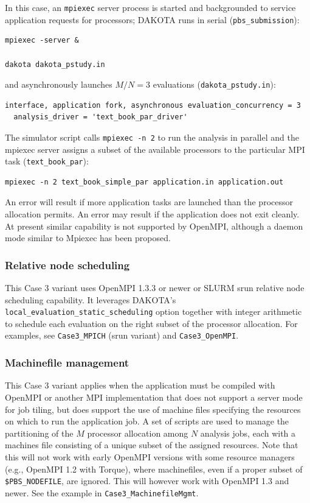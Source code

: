 In this case, an {\tt mpiexec} server process is started and
backgrounded to service application requests for processors; DAKOTA
runs in serial ({\tt pbs\_submission}):
\begin{verbatim}
mpiexec -server &

dakota dakota_pstudy.in
\end{verbatim}
and asynchronously launches $M/N=3$ evaluations ({\tt dakota\_pstudy.in}):
\begin{verbatim}
interface, application fork, asynchronous evaluation_concurrency = 3
  analysis_driver = 'text_book_par_driver'
\end{verbatim}
The simulator script calls {\tt mpiexec -n 2} to run the analysis in
parallel and the mpiexec server assigns a subset of the available
processors to the particular MPI task ({\tt text\_book\_par}):
\begin{verbatim}
mpiexec -n 2 text_book_simple_par application.in application.out
\end{verbatim}
An error will result if more application tasks are launched than the
processor allocation permits.  An error may result if the application
does not exit cleanly.  At present similar capability is not supported
by OpenMPI, although a daemon mode similar to Mpiexec has been
proposed.

\subsubsection{Relative node scheduling}

This Case 3 variant uses OpenMPI 1.3.3 or newer or SLURM srun relative
node scheduling capability.  It leverages DAKOTA's
\texttt{local\_evaluation\_static\_scheduling} option together with
integer arithmetic to schedule each evaluation on the right subset of
the processor allocation.  For examples, see \texttt{Case3\_MPICH}
(srun variant) and \texttt{Case3\_OpenMPI}.

\subsubsection{Machinefile management}

This Case 3 variant applies when the application must be compiled with
OpenMPI or another MPI implementation that does not support a server
mode for job tiling, but does support the use of machine files
specifying the resources on which to run the application job.  A set
of scripts are used to manage the partitioning of the $M$ processor
allocation among $N$ analysis jobs, each with a machines file
consisting of a unique subset of the assigned resources.  Note that
this will not work with early OpenMPI versions with some resource
managers (e.g., OpenMPI 1.2 with Torque), where machinefiles, even if
a proper subset of {\tt \$PBS\_NODEFILE}, are ignored.  This will
however work with OpenMPI 1.3 and newer.  See the example in
\texttt{Case3\_MachinefileMgmt}.

